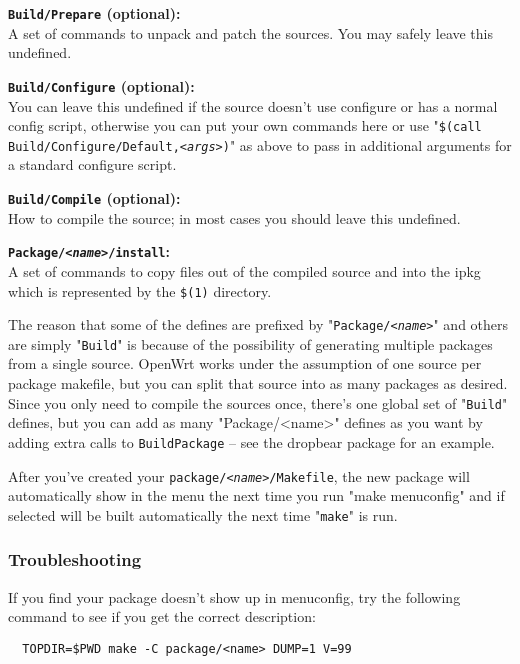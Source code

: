 \textbf{\texttt{Build/Prepare} (optional):} \\
   A set of commands to unpack and patch the sources. You may safely leave this
   undefined.

\textbf{\texttt{Build/Configure} (optional):} \\
   You can leave this undefined if the source doesn't use configure or has a
   normal config script, otherwise you can put your own commands here or use
   "\texttt{\$(call Build/Configure/Default,\textit{<args>})}" as above to
   pass in additional arguments for a standard configure script.

\textbf{\texttt{Build/Compile} (optional):} \\
   How to compile the source; in most cases you should leave this undefined.

\textbf{\texttt{Package/\textit{<name>}/install}:} \\
   A set of commands to copy files out of the compiled source and into the ipkg
   which is represented by the \texttt{\$(1)} directory.
   
The reason that some of the defines are prefixed by "\texttt{Package/\textit{<name>}}"
and others are simply "\texttt{Build}" is because of the possibility of generating
multiple packages from a single source. OpenWrt works under the assumption of one 
source per package makefile, but you can split that source into as many packages as
desired. Since you only need to compile the sources once, there's one global set of 
"\texttt{Build}" defines, but you can add as many "Package/<name>" defines as you want
by adding extra calls to \texttt{BuildPackage} -- see the dropbear package for an example.

After you've created your \texttt{package/\textit{<name>}/Makefile}, the new package 
will automatically show in the menu the next time you run "make menuconfig" and if selected
will be built automatically the next time "\texttt{make}" is run.

\subsubsection{Troubleshooting}

If you find your package doesn't show up in menuconfig, try the following command to 
see if you get the correct description:

\begin{Verbatim}
  TOPDIR=$PWD make -C package/<name> DUMP=1 V=99
\end{Verbatim}

